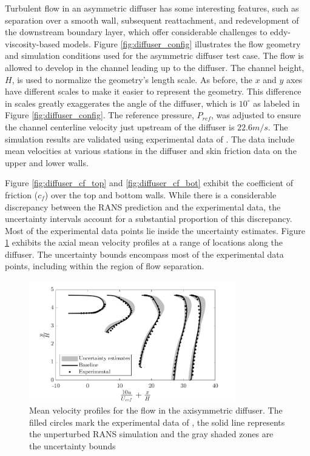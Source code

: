 Turbulent flow in an asymmetric diffuser has some interesting features, such as separation over a smooth wall, subsequent reattachment, and redevelopment of the downstream boundary layer, which offer considerable challenges to eddy-viscosity-based models.
Figure \ref{fig:diffuser_config} illustrates the flow geometry and simulation conditions used for the asymmetric diffuser test case.
The flow is allowed to develop in the channel leading up to the diffuser.
The channel height, $H$, is used to normalize the geometry's length scale.
As before, the $x$ and $y$ axes have different scales to make it easier to represent the geometry.
This difference in scales greatly exaggerates the angle of the diffuser, which is $10^\circ$ as labeled in Figure \ref{fig:diffuser_config}.
The reference pressure, $P_{ref}$, was adjusted to ensure the channel centerline velocity just upstream of the diffuser is $22.6 m/s$. 
The simulation results are validated using experimental data of \cite{buice}. The data include mean velocities at various stations in the diffuser and skin friction data on the upper and lower walls. 

Figure \ref{fig:diffuser_cf_top} and \ref{fig:diffuser_cf_bot} exhibit the coefficient of friction ($c_f$) over the top and bottom walls.
While there is a considerable discrepancy between the RANS prediction and the experimental data, the uncertainty intervals account for a substantial proportion of this discrepancy.
Most of the experimental data points lie inside the uncertainty estimates.
Figure \ref{fig:diffuser_vel_prof} exhibits the axial mean velocity profiles at a range of locations along the diffuser. The uncertainty bounds encompass most of the experimental data points, including within the region of flow separation. 

\begin{figure}
\centering
\includegraphics[width=0.8\textwidth]{code/image_gen/diffuser/images/diffuser_vel_prof.png}
\caption{Mean velocity profiles for the flow in the axisymmetric diffuser. The filled circles mark the experimental data of \cite{buice}, the solid line represents the unperturbed RANS simulation and the gray shaded zones are the uncertainty bounds\label{fig:diffuser_vel_prof}}
\end{figure}

